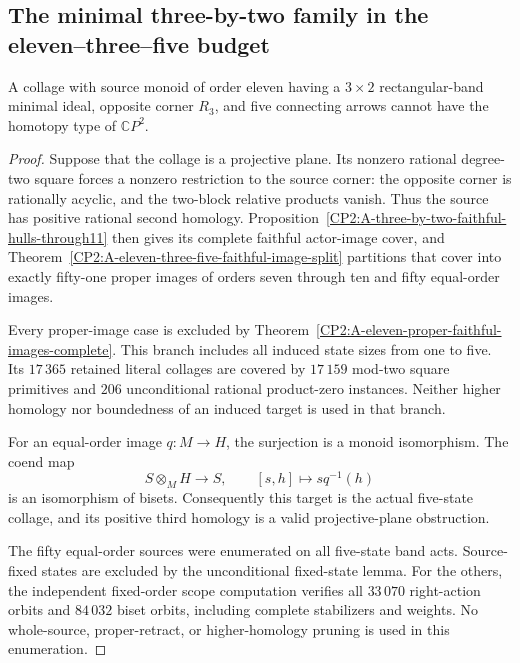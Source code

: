\subsection{The minimal three-by-two family in the eleven--three--five budget}

\begin{theorem}
\label{CP2:A-eleven-three-five-three-by-two-complete}
A collage with source monoid of order eleven having a
$3\times2$ rectangular-band minimal ideal, opposite corner
$R_3$, and five connecting arrows cannot have the homotopy
type of $\mathbb CP^2$.
\end{theorem}
\begin{proof}
Suppose that the collage is a projective plane.  Its nonzero
rational degree-two square forces a nonzero restriction to
the source corner: the opposite corner is rationally
acyclic, and the two-block relative products vanish.
Thus the source has positive rational second homology.
Proposition~\ref{CP2:A-three-by-two-faithful-hulls-through11}
then gives its complete faithful actor-image cover, and
Theorem~\ref{CP2:A-eleven-three-five-faithful-image-split}
partitions that cover into exactly fifty-one proper images
of orders seven through ten and fifty equal-order images.

Every proper-image case is excluded by
Theorem~\ref{CP2:A-eleven-proper-faithful-images-complete}.
This branch includes all induced state sizes from one to
five.  Its $17\,365$ retained literal collages are covered
by $17\,159$ mod-two square primitives and $206$
unconditional rational product-zero instances.  Neither
higher homology nor boundedness of an induced target is
used in that branch.

For an equal-order image $q:M\to H$, the surjection is a
monoid isomorphism.  The coend map
\[
        S\otimes_M H\longrightarrow S,
        \qquad [s,h]\longmapsto s q^{-1}(h)
\]
is an isomorphism of bisets.  Consequently this target is
the actual five-state collage, and its positive third
homology is a valid projective-plane obstruction.

The fifty equal-order sources were enumerated on all
five-state band acts.  Source-fixed states are excluded by
the unconditional fixed-state lemma.  For the others, the
independent fixed-order scope computation verifies all
$33\,070$ right-action orbits and $84\,032$ biset orbits,
including complete stabilizers and weights.  No
whole-source, proper-retract, or higher-homology pruning
is used in this enumeration.


\end{proof}
